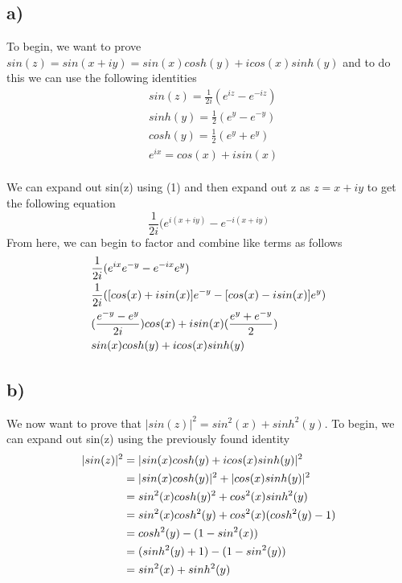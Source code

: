 \documentclass[notitlepage]{article}
\begin{document}
    \subsection*{a)}
    To begin, we want to prove $sin(z) = sin(x+iy) = sin(x)cosh(y)+icos(x)sinh(y)$ and to do this we can use the following identities
    \begin{equation}
        \begin{aligned}
            & sin(z)= \frac{1}{2i}(e^{iz}-e^{-iz})\\
            & sinh(y) = \frac{1}{2}(e^y-e^{-y}) \\
            & cosh(y) = \frac{1}{2}(e^y+e^{y}) \\
            & e^{ix} = cos(x) + isin(x)
        \end{aligned}
    \end{equation} \\
    We can expand out sin(z) using (1) and then expand out z as $z=x+iy$ to get the following equation 
    $$\frac{1}{2i}(e^{i(x+iy)}-e^{-i(x+iy)}$$
    From here, we can begin to factor and combine like terms as follows
    \begin{equation}
        \begin{aligned}
            & \frac{1}{2i}(e^{ix}e^{-y}-e^{-ix}e^y)\notag \\
            & \frac{1}{2i}([cos(x)+isin(x)]e^{-y}-[cos(x)-isin(x)]e^y) \\
            & (\frac{e^{-y}-e^y}{2i})cos(x)+isin(x)(\frac{e^y+e^{-y}}{2}) \\
            & sin(x)cosh(y)+icos(x)sinh(y)
        \end{aligned}
    \end{equation}
    \subsection*{b)}
    We now want to prove that $|sin(z)|^2 = sin^2(x)+sinh^2(y)$. To begin, we can expand out sin(z) using the previously found identity
   \begin{equation}
    \begin{aligned}
       |sin(z)|^2  &= |sin(x)cosh(y) + icos(x)sinh(y)|^2\notag \\
                   &= |sin(x)cosh(y)|^2+|cos(x)sinh(y)|^2 \\
                   &= sin^2(x)cosh(y)^2 + cos^2(x)sinh^2(y)\\
                   &= sin^2(x)cosh^2(y) + cos^2(x)(cosh^2(y)-1)\\
                   &= cosh^2(y) - (1-sin^2(x))\\
                   &= (sinh^2(y)+1) - (1-sin^2(y))\\
                   &= sin^2(x) + sinh^2(y)
    \end{aligned}
\end{equation}
\end{document}
